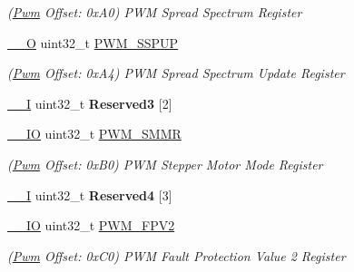 \begin{DoxyCompactItemize}
\begin{DoxyCompactList}\small\item\em (\mbox{\hyperlink{structPwm}{Pwm}} Offset\+: 0x\+A0) P\+WM Spread Spectrum Register \end{DoxyCompactList}\item 
\mbox{\label{structPwm_a9eaa5140cd0ab84ba47f03090834f23c}} 
\mbox{\hyperlink{core__cm7_8h_a7e25d9380f9ef903923964322e71f2f6}{\+\_\+\+\_\+O}} uint32\+\_\+t \mbox{\hyperlink{structPwm_a9eaa5140cd0ab84ba47f03090834f23c}{P\+W\+M\+\_\+\+S\+S\+P\+UP}}
\begin{DoxyCompactList}\small\item\em (\mbox{\hyperlink{structPwm}{Pwm}} Offset\+: 0x\+A4) P\+WM Spread Spectrum Update Register \end{DoxyCompactList}\item 
\mbox{\label{structPwm_ae8d93426dbdd33bc72ced1ca1ebd72d4}} 
\mbox{\hyperlink{core__cm7_8h_af63697ed9952cc71e1225efe205f6cd3}{\+\_\+\+\_\+I}} uint32\+\_\+t {\bfseries Reserved3} \mbox{[}2\mbox{]}
\item 
\mbox{\label{structPwm_adc82466754e7003ffc6f0017aaef1b41}} 
\mbox{\hyperlink{core__cm7_8h_aec43007d9998a0a0e01faede4133d6be}{\+\_\+\+\_\+\+IO}} uint32\+\_\+t \mbox{\hyperlink{structPwm_adc82466754e7003ffc6f0017aaef1b41}{P\+W\+M\+\_\+\+S\+M\+MR}}
\begin{DoxyCompactList}\small\item\em (\mbox{\hyperlink{structPwm}{Pwm}} Offset\+: 0x\+B0) P\+WM Stepper Motor Mode Register \end{DoxyCompactList}\item 
\mbox{\label{structPwm_a1877338cb13e50f642858bb899733975}} 
\mbox{\hyperlink{core__cm7_8h_af63697ed9952cc71e1225efe205f6cd3}{\+\_\+\+\_\+I}} uint32\+\_\+t {\bfseries Reserved4} \mbox{[}3\mbox{]}
\item 
\mbox{\label{structPwm_a1b068d9100376c38d9ea70c401a94f6b}} 
\mbox{\hyperlink{core__cm7_8h_aec43007d9998a0a0e01faede4133d6be}{\+\_\+\+\_\+\+IO}} uint32\+\_\+t \mbox{\hyperlink{structPwm_a1b068d9100376c38d9ea70c401a94f6b}{P\+W\+M\+\_\+\+F\+P\+V2}}
\begin{DoxyCompactList}\small\item\em (\mbox{\hyperlink{structPwm}{Pwm}} Offset\+: 0x\+C0) P\+WM Fault Protection Value 2 Register \end{DoxyCompactList}\item 

\end{DoxyCompactItemize}
